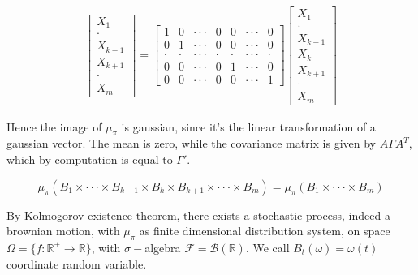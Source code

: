 \begin{gather*}
    \begin{bmatrix}
        X_1 \\
        \cdot \\
        X_{k-1} \\
        X_{k+1} \\
        \cdot \\
        X_m
    \end{bmatrix}
    = 
    \begin{bmatrix}
        1 & 0 & \cdot\cdot\cdot & 0 & 0 &\cdot\cdot\cdot & 0 \\
        0 & 1 & \cdot\cdot\cdot & 0 & 0 & \cdot\cdot\cdot & 0 \\
        \cdot & \cdot & \cdot\cdot\cdot & \cdot & \cdot & \cdot\cdot\cdot & \cdot \\
        0 & 0 & \cdot\cdot\cdot & 0 & 1 & \cdot\cdot\cdot & 0 \\
        0 & 0 & \cdot\cdot\cdot & 0 & 0 & \cdot\cdot\cdot & 1 
    \end{bmatrix}
    \begin{bmatrix}
        X_1 \\
        \cdot \\
        X_{k-1} \\
        X_k \\
        X_{k+1} \\
        \cdot \\
        X_m
    \end{bmatrix}
\end{gather*}

Hence the image of $\mu_{\pi}$ is gaussian, since it's the linear transformation of a gaussian vector. The mean is zero, while the covariance matrix is given by $A \Gamma A^T$, which by computation is equal to $\Gamma'$. 

\begin{equation*}
    \mu_{\pi} (B_1 \times \cdot\cdot\cdot \times B_{k-1} \times B_k \times B_{k+1} \times \cdot\cdot\cdot \times B_m ) = \mu_{\pi} (B_1 \times \cdot\cdot\cdot \times B_m )
\end{equation*}

By Kolmogorov existence theorem, there exists a stochastic process, indeed a brownian motion, with $\mu_{\pi}$ as finite dimensional distribution system, on space $\Omega = \{ f : \mathbb{R}^+ \to \mathbb{R} \}$, with $\sigma-$algebra $\mathcal{F} = \mathcal{B}(\mathbb{R})$. We call $B_t(\omega) = \omega(t)$ coordinate random variable. 

